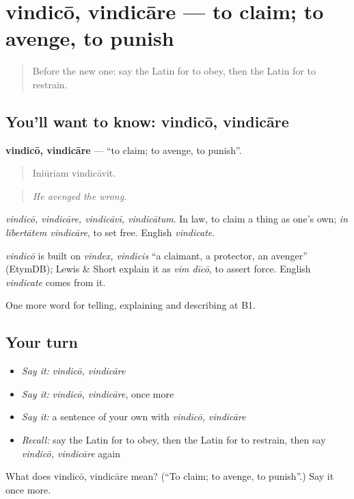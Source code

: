 \section[vindicō, vindicāre]{vindicō, vindicāre — to claim; to avenge, to punish}

\label{lesson:LA-C416-vindico}



\begin{quote}
Before the new one: say the Latin for to obey, then the Latin for to restrain.
\end{quote}

\subsection*{You'll want to know: vindicō, vindicāre}
\textbf{vindicō, vindicāre} — \textquotedblleft{}to claim; to avenge, to punish\textquotedblright{}.

\begin{quote}
Iniūriam vindicāvit.
\end{quote}

\begin{quote}
\emph{He avenged the wrong.}
\end{quote}

\emph{vindicō, vindicāre, vindicāvī, vindicātum}. In law, to claim a thing as one's own; \emph{in lībertātem vindicāre}, to set free. English \emph{vindicate}.

\begin{cousinweb}
\emph{vindicō} is built on \emph{vindex, vindicis} \textquotedblleft{}a claimant, a protector, an avenger\textquotedblright{} (EtymDB); Lewis \& Short explain it as \emph{vim dīcō}, to assert force. English \emph{vindicate} comes from it.
\end{cousinweb}

\begin{grammarlens}[title={What you've built}]
One more word for telling, explaining and describing at B1.
\end{grammarlens}

\subsection*{Your turn}
\begin{itemize}
\raggedright
  \item \emph{Say it:} \emph{vindicō, vindicāre}
  \item \emph{Say it:} \emph{vindicō, vindicāre}, once more
  \item \emph{Say it:} a sentence of your own with \emph{vindicō, vindicāre}
  \item \emph{Recall:} say the Latin for to obey, then the Latin for to restrain, then say \emph{vindicō, vindicāre} again
\end{itemize}

\begin{tcolorbox}[breakable,colback=teal!4,colframe=teal!35!black,title={Before you move on}]
What does vindicō, vindicāre mean? (\textquotedblleft{}To claim; to avenge, to punish\textquotedblright{}.) Say it once more.
\end{tcolorbox}
